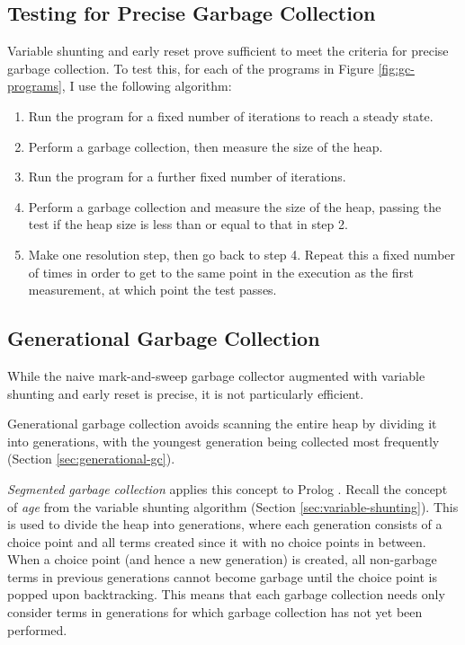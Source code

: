 \subsection{Testing for Precise Garbage Collection}

\label{sec:gc-testing}

Variable shunting and early reset prove sufficient to meet the criteria for precise garbage collection. To test this, for each of the programs in Figure \ref{fig:gc-programs}, I use the following algorithm:

\begin{enumerate}
\item Run the program for a fixed number of iterations to reach a steady state.
\item Perform a garbage collection, then measure the size of the heap.
\item Run the program for a further fixed number of iterations.
\item Perform a garbage collection and measure the size of the heap, passing the test if the heap size is less than or equal to that in step 2.
\item Make one resolution step, then go back to step 4. Repeat this a fixed number of times in order to get to the same point in the execution as the first measurement, at which point the test passes.
\end{enumerate}

\subsection{Generational Garbage Collection}

\label{sec:implementation-generational-gc}

While the naive mark-and-sweep garbage collector augmented with variable shunting and early reset is precise, it is not particularly efficient.

Generational garbage collection avoids scanning the entire heap by dividing it into generations, with the youngest generation being collected most frequently (Section \ref{sec:generational-gc}).

\emph{Segmented garbage collection} applies this concept to Prolog \cite{applebyGarbargecollectionProlog1988}. Recall the concept of \emph{age} from the variable shunting algorithm (Section \ref{sec:variable-shunting}). This is used to divide the heap into generations, where each generation consists of a choice point and all terms created since it with no choice points in between. When a choice point (and hence a new generation) is created, all non-garbage terms in previous generations cannot become garbage until the choice point is popped upon backtracking. This means that each garbage collection needs only consider terms in generations for which garbage collection has not yet been performed.

